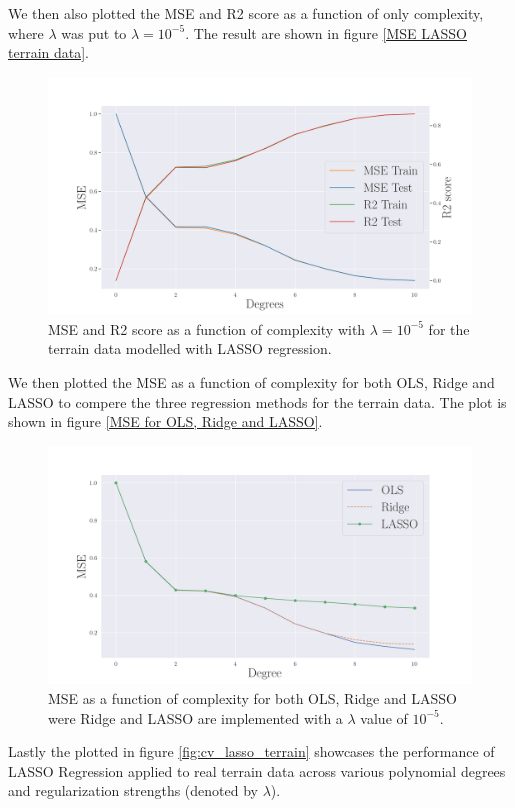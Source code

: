 %
\noindent We then also plotted the MSE and R2 score as a function of only complexity, where $\lambda$ was put to $\lambda = 10^{-5}$. The result are shown in figure \eqref{MSE LASSO terrain data}.
\begin{figure}[H]
	\centering
	\includegraphics[width=\linewidth]{images/Figure_26.png}
	\caption{MSE and R2 score as a function of complexity with $\lambda = 10^{-5}$ for the terrain data modelled with LASSO regression. }
	\label{MSE LASSO terrain data}
\end{figure}
%
\noindent We then plotted the MSE as a function of complexity for both OLS, Ridge and LASSO to compere the three regression methods for the terrain data. The plot is shown in figure \eqref{MSE for OLS, Ridge and LASSO}.
\begin{figure}[H]
	\centering
	\includegraphics[width=\linewidth]{images/Figure_28.png}
	\caption{MSE as a function of complexity for both OLS, Ridge and LASSO were Ridge and LASSO are implemented with a $\lambda$ value of $10^{-5}$. }
	\label{MSE for OLS, Ridge and LASSO}
\end{figure}
%
\noindent Lastly the plotted in figure \eqref{fig:cv_lasso_terrain} showcases the performance of LASSO Regression applied to real terrain data across various polynomial degrees and regularization strengths (denoted by $\lambda$). 
